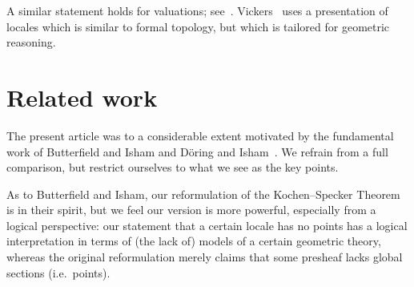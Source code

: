 \documentclass[11pt]{article}
\begin{document}
A similar statement holds for
valuations;
see~\cite{vickersintegration,Coquand/Spitters:integrals-valuations}.
Vickers~\cite{PPExp} uses a presentation of locales which is similar to formal
topology, but which is tailored for geometric reasoning.

\section{Related work}
\label{sec:doringisham}
The present article was to a considerable extent motivated by the fundamental work of 
Butterfield and Isham \cite{butterfieldisham1,butterfieldisham2}
and D\"{o}ring and 
Isham~\cite{doringisham1,doringisham2,doringisham3,doringisham4,doeringisham:review}. We
refrain from a full comparison,  but restrict ourselves to what we see as the  key points.

As to Butterfield and Isham, our reformulation of the Kochen--Specker Theorem is in their spirit, but we feel our version is more powerful, especially from a logical perspective: our statement that a certain locale has no points has a logical interpretation in terms of (the lack of) models of a certain geometric theory, whereas the original reformulation \cite{butterfieldisham1} merely claims that some presheaf lacks global sections (i.e.\ points). 
\end{document}
